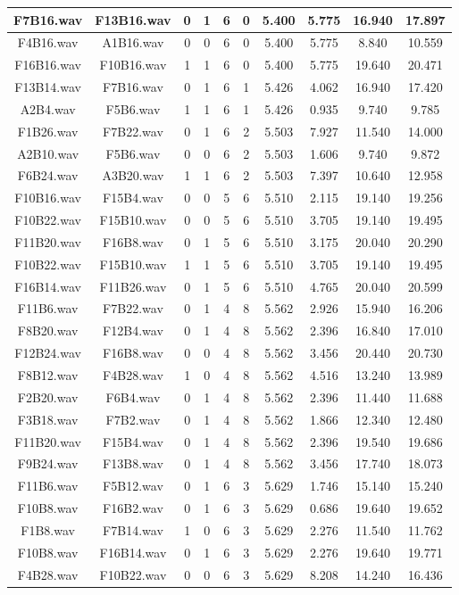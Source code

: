 \documentclass[11pt,a4paper]{book}
\begin{document}
\begin{longtable}[c]{|c|c|c|c|c|c|c|c|c|c|}
F7B16.wav&F13B16.wav&0&1&6&0&5.400&5.775&16.940&17.897\\ \hline
F4B16.wav&A1B16.wav&0&0&6&0&5.400&5.775&8.840&10.559\\ \hline
F16B16.wav&F10B16.wav&1&1&6&0&5.400&5.775&19.640&20.471\\ \hline
F13B14.wav&F7B16.wav&0&1&6&1&5.426&4.062&16.940&17.420\\ \hline
A2B4.wav&F5B6.wav&1&1&6&1&5.426&0.935&9.740&9.785\\ \hline
F1B26.wav&F7B22.wav&0&1&6&2&5.503&7.927&11.540&14.000\\ \hline
A2B10.wav&F5B6.wav&0&0&6&2&5.503&1.606&9.740&9.872\\ \hline
F6B24.wav&A3B20.wav&1&1&6&2&5.503&7.397&10.640&12.958\\ \hline
F10B16.wav&F15B4.wav&0&0&5&6&5.510&2.115&19.140&19.256\\ \hline
F10B22.wav&F15B10.wav&0&0&5&6&5.510&3.705&19.140&19.495\\ \hline
F11B20.wav&F16B8.wav&0&1&5&6&5.510&3.175&20.040&20.290\\ \hline
F10B22.wav&F15B10.wav&1&1&5&6&5.510&3.705&19.140&19.495\\ \hline
F16B14.wav&F11B26.wav&0&1&5&6&5.510&4.765&20.040&20.599\\ \hline
F11B6.wav&F7B22.wav&0&1&4&8&5.562&2.926&15.940&16.206\\ \hline
F8B20.wav&F12B4.wav&0&1&4&8&5.562&2.396&16.840&17.010\\ \hline
F12B24.wav&F16B8.wav&0&0&4&8&5.562&3.456&20.440&20.730\\ \hline
F8B12.wav&F4B28.wav&1&0&4&8&5.562&4.516&13.240&13.989\\ \hline
F2B20.wav&F6B4.wav&0&1&4&8&5.562&2.396&11.440&11.688\\ \hline
F3B18.wav&F7B2.wav&0&1&4&8&5.562&1.866&12.340&12.480\\ \hline
F11B20.wav&F15B4.wav&0&1&4&8&5.562&2.396&19.540&19.686\\ \hline
F9B24.wav&F13B8.wav&0&1&4&8&5.562&3.456&17.740&18.073\\ \hline
F11B6.wav&F5B12.wav&0&1&6&3&5.629&1.746&15.140&15.240\\ \hline
F10B8.wav&F16B2.wav&0&1&6&3&5.629&0.686&19.640&19.652\\ \hline
F1B8.wav&F7B14.wav&1&0&6&3&5.629&2.276&11.540&11.762\\ \hline
F10B8.wav&F16B14.wav&0&1&6&3&5.629&2.276&19.640&19.771\\ \hline
F4B28.wav&F10B22.wav&0&0&6&3&5.629&8.208&14.240&16.436\\ \hline

\end{longtable}
\end{document}
